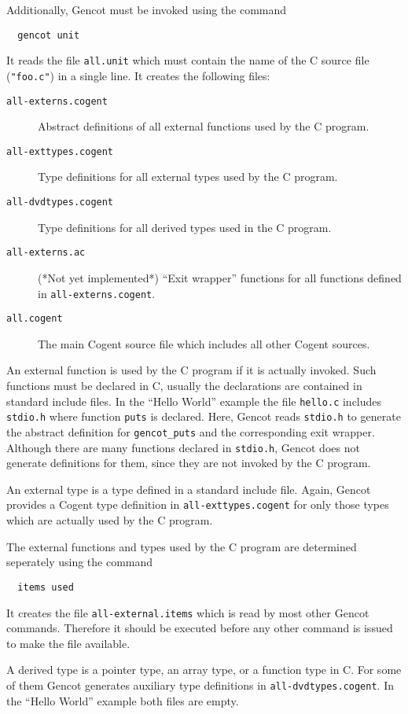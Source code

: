 \documentclass[a4paper]{report}
\newcommand{\code}[1]{\textnormal{\texttt{#1}}}
\begin{document}
Additionally, Gencot must be invoked using the command
\begin{verbatim}
  gencot unit
\end{verbatim}
It reads the file \code{all.unit} which must contain the name of the C source file (\code{"foo.c"}) in a single line. 
It creates the following files:
\begin{description}
\item[\code{all-externs.cogent}] Abstract definitions of all external functions used by the C program.
\item[\code{all-exttypes.cogent}] Type definitions for all external types used by the C program.
\item[\code{all-dvdtypes.cogent}] Type definitions for all derived types used in the C program.
\item[\code{all-externs.ac}] (*Not yet implemented*) ``Exit wrapper'' functions for all functions defined in 
\code{all-externs.cogent}.
\item[\code{all.cogent}] The main Cogent source file which includes all other Cogent sources.
\end{description}
An external function is used by the C program if it is actually invoked. Such functions must be declared in C, usually
the declarations are contained in standard include files. In the ``Hello World'' example the file \code{hello.c} includes
\code{stdio.h} where function \code{puts} is declared. Here, Gencot reads \code{stdio.h} to generate the abstract definition for
\code{gencot\_puts} and the corresponding exit wrapper. Although there are many functions declared in \code{stdio.h}, Gencot
does not generate definitions for them, since they are not invoked by the C program.

An external type is a type defined in a standard include file. Again, Gencot provides a Cogent type definition in 
\code{all-exttypes.cogent} for only those types which are actually used by the C program. 

The external functions and types used by the C program are determined seperately using the command
\begin{verbatim}
  items used
\end{verbatim}
It creates the file \code{all-external.items} which is read by most other Gencot commands. Therefore it should be executed
before any other command is issued to make the file available.

A derived type is a pointer type, an array type, or a function type in C. For 
some of them Gencot generates auxiliary type definitions in \code{all-dvdtypes.cogent}. In the ``Hello World'' example 
both files are empty.
\end{document}

